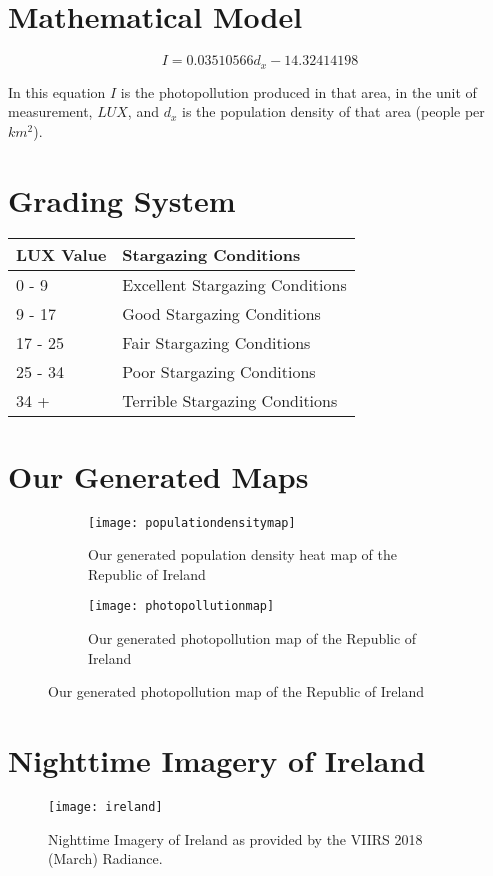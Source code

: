 \section{Mathematical Model}

\begin{equation}
\label{model} 
I = 0.03510566 d_x - 14.32414198 
\end{equation}

In this equation $I$ is the photopollution produced in that area, in the unit of measurement, $LUX$, and $d_x$ is the population density of that area (people per $km^{2}$). 

\hfill{}

\section{Grading System}
\begin{tabularx}{\textwidth}{|X|l|}
  \hline
  \textbf{LUX Value} & \textbf{Stargazing Conditions} \\ [25pt]
\hline
0 - 9 & Excellent Stargazing Conditions\\ [40pt]
\hline
9 - 17 & Good Stargazing Conditions\\ [40pt]
\hline
17 - 25 & Fair Stargazing Conditions\\ [40pt]
\hline
25 - 34 & Poor Stargazing Conditions\\ [40pt]
\hline
34 + & Terrible Stargazing Conditions\\ [40pt]
\hline
\end{tabularx}

\hfill

\section{Our Generated Maps}
\begin{figure}[H]
    \centering
    \caption{Maps generated in QGIS.}
    \label{qgis}
    \begin{subfigure}{\textwidth}
        \centering
        \texttt{[image: populationdensitymap]}
        \caption{Our generated population density heat map of the Republic of Ireland}
        \label{pdheatmap}
    \end{subfigure}
    \hfill
    \begin{subfigure}{\textwidth}
        \centering
        \texttt{[image: photopollutionmap]}
        \caption{Our generated photopollution map of the Republic of Ireland}
        \label{photopollutionmap}
    \end{subfigure}
\end{figure}

\section{Nighttime Imagery of Ireland}
\begin{figure}[h]
    \centering
    \texttt{[image: ireland]}
    \caption{Nighttime Imagery of Ireland as provided by the VIIRS 2018 (March) Radiance.}
    \label{ireland}
\end{figure}